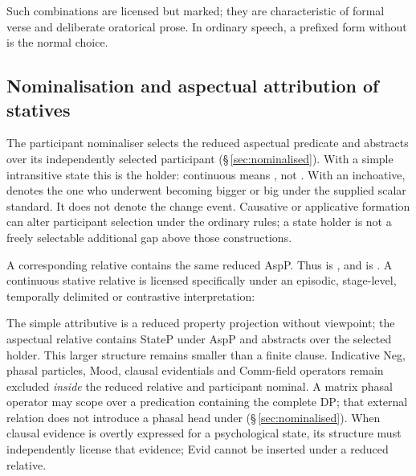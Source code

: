 \noindent Such combinations are licensed but marked; they are characteristic
of formal verse and deliberate oratorical prose. In ordinary speech, a
prefixed form without  is the normal choice.

\subsection{Nominalisation and aspectual attribution of statives}

The participant nominaliser  selects the reduced aspectual
predicate and abstracts over its independently selected participant
(§\,\ref{sec:nominalised}). With a simple intransitive state this is the
holder: continuous  means , not
. With an inchoative,  denotes the one
who underwent becoming bigger or big under the supplied scalar standard.
It does not denote the change event. Causative or applicative formation can
alter participant selection under the ordinary rules; a state holder is not
a freely selectable additional gap above those constructions.

\pex
\a {}  
\a {}  
\a {}  
\a {}  
\xe

A corresponding  relative contains the same reduced AspP.
Thus  is , and
 is .
A continuous stative relative is licensed specifically under an episodic,
stage-level, temporally delimited or contrastive interpretation:

\pex
\a {}  
\a {}  
\a {} 
\xe

The simple attributive is a reduced property projection without viewpoint;
the aspectual relative contains StateP under AspP and abstracts over the
selected holder. This larger structure remains smaller than a finite clause.
Indicative Neg, phasal particles, Mood, clausal evidentials and Comm-field
operators remain excluded \emph{inside} the reduced relative and participant
nominal. A matrix phasal operator may scope over a predication containing
the complete DP; that external relation does not introduce a phasal head
under  (§\,\ref{sec:nominalised}). When clausal evidence is overtly expressed for a psychological state, its
structure must independently license that evidence; Evid cannot be inserted
under a reduced relative.


